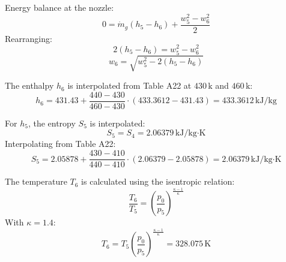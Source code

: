 Energy balance at the nozzle:  
\[
0 = \dot{m}_g (h_5 - h_6) + \frac{w_5^2 - w_6^2}{2}
\]  
Rearranging:  
\[
2(h_5 - h_6) = w_5^2 - w_6^2
\]  
\[
w_6 = \sqrt{w_5^2 - 2(h_5 - h_6)}
\]  

The enthalpy \( h_6 \) is interpolated from Table A22 at \( 430 \, \text{k} \) and \( 460 \, \text{k} \):  
\[
h_6 = 431.43 + \frac{440 - 430}{460 - 430} \cdot (433.3612 - 431.43) = 433.3612 \, \text{kJ/kg}
\]  

For \( h_5 \), the entropy \( S_5 \) is interpolated:  
\[
S_5 = S_4 = 2.06379 \, \text{kJ/kg·K}
\]  
Interpolating from Table A22:  
\[
S_5 = 2.05878 + \frac{430 - 410}{440 - 410} \cdot (2.06379 - 2.05878) = 2.06379 \, \text{kJ/kg·K}
\]  

The temperature \( T_6 \) is calculated using the isentropic relation:  
\[
\frac{T_6}{T_5} = \left( \frac{p_0}{p_5} \right)^{\frac{\kappa - 1}{\kappa}}
\]  
With \( \kappa = 1.4 \):  
\[
T_6 = T_5 \left( \frac{p_0}{p_5} \right)^{\frac{\kappa - 1}{\kappa}} = 328.075 \, \text{K}
\]